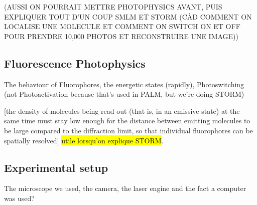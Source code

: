 (AUSSI ON POURRAIT METTRE PHOTOPHYSICS AVANT, PUIS EXPLIQUER TOUT D'UN COUP SMLM ET STORM (CÀD COMMENT ON LOCALISE UNE MOLECULE ET COMMENT ON SWITCH ON ET OFF POUR PRENDRE 10,000 PHOTOS ET RECONSTRUIRE UNE IMAGE))


\subsection{Fluorescence Photophysics}
The behaviour of Fluorophores, the energetic states (rapidly), Photoswitching (not Photoactivation because that's used in PALM, but we're doing STORM)

[the density of molecules being read out
    (that is, in an emissive state) at the same time must stay low
    enough for the distance between emitting molecules to be large
    compared to the diﬀraction limit, so that individual fluorophores
    can be spatially resolved] \hl{utile lorsqu'on explique STORM}.

\subsection{Experimental setup}
The microscope we used, the camera, the laser engine and the fact a computer was used?


